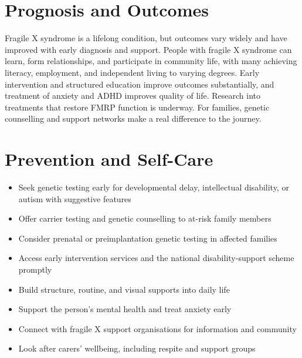 \section*{Prognosis and Outcomes}
Fragile X syndrome is a lifelong condition, but outcomes vary widely and have improved with early diagnosis and support. People with fragile X syndrome can learn, form relationships, and participate in community life, with many achieving literacy, employment, and independent living to varying degrees. Early intervention and structured education improve outcomes substantially, and treatment of anxiety and ADHD improves quality of life. Research into treatments that restore FMRP function is underway. For families, genetic counselling and support networks make a real difference to the journey.

\section*{Prevention and Self-Care}
\begin{itemize}
    \item Seek genetic testing early for developmental delay, intellectual disability, or autism with suggestive features
    \item Offer carrier testing and genetic counselling to at-risk family members
    \item Consider prenatal or preimplantation genetic testing in affected families
    \item Access early intervention services and the national disability-support scheme promptly
    \item Build structure, routine, and visual supports into daily life
    \item Support the person's mental health and treat anxiety early
    \item Connect with fragile X support organisations for information and community
    \item Look after carers' wellbeing, including respite and support groups
\end{itemize}

